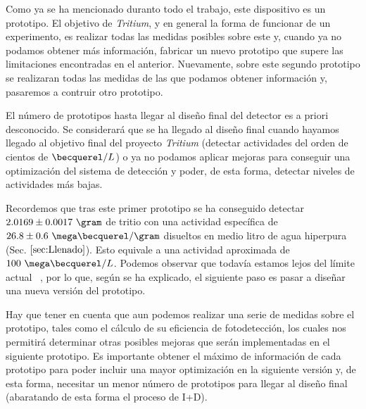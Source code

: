 Como ya se ha mencionado duranto todo el trabajo, este dispositivo es un prototipo. El objetivo de \textit{Tritium}, y en general la forma de funcionar de un experimento, es realizar todas las medidas posibles sobre este y, cuando ya no podamos obtener más información, fabricar un nuevo prototipo que supere las limitaciones encontradas en el anterior. Nuevamente, sobre este segundo prototipo se realizaran todas las medidas de las que podamos obtener información y, pasaremos a contruir otro prototipo.

El número de prototipos hasta llegar al diseño final del detector es a priori desconocido. Se considerará que se ha llegado al diseño final cuando hayamos llegado al objetivo final del proyecto \textit{Tritium} (detectar actividades del orden de cientos de $\becquerel/L$) o ya no podamos aplicar mejoras para conseguir una optimización del sistema de detección y poder, de esta forma, detectar niveles de actividades más bajas.

Recordemos que tras este primer prototipo se ha conseguido detectar $2.0169 \pm 0.0017~\gram$ de tritio con una actividad específica de $26.8 \pm 0.6~\mega\becquerel/\gram$ disueltos en medio litro de agua hiperpura (Sec. $\ref{sec:Llenado}$). Esto equivale a una actividad aproximada de $100~\mega\becquerel/L$. Podemos observar que todavía estamos lejos del límite actual ~\cite{Rat}, por lo que, según se ha explicado, el siguiente paso es pasar a diseñar una nueva versión del prototipo. 

Hay que tener en cuenta que aun podemos realizar una serie de medidas sobre el prototipo, tales como el cálculo de su eficiencia de fotodetección, los cuales nos permitirá determinar otras posibles mejoras que serán implementadas en el siguiente prototipo. Es importante obtener el máximo de información de cada prototipo para poder incluir una mayor optimización en la siguiente versión y, de esta forma, necesitar un menor número de prototipos para llegar al diseño final (abaratando de esta forma el proceso de I+D). 

